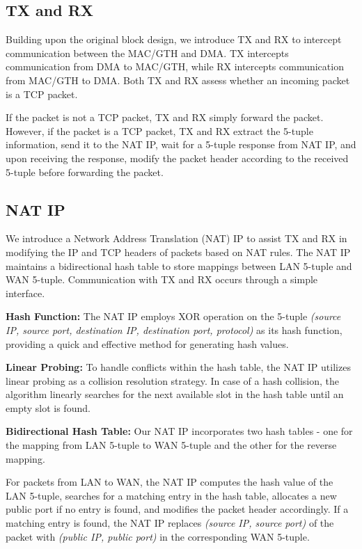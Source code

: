 \subsection{TX and RX}
Building upon the original block design, we introduce TX and RX to intercept communication between the MAC/GTH and DMA. TX intercepts communication from DMA to MAC/GTH, while RX intercepts communication from MAC/GTH to DMA. Both TX and RX assess whether an incoming packet is a TCP packet.

If the packet is not a TCP packet, TX and RX simply forward the packet. However, if the packet is a TCP packet, TX and RX extract the 5-tuple information, send it to the NAT IP, wait for a 5-tuple response from NAT IP, and upon receiving the response, modify the packet header according to the received 5-tuple before forwarding the packet.

\subsection{NAT IP}
We introduce a Network Address Translation (NAT) IP to assist TX and RX in modifying the IP and TCP headers of packets based on NAT rules. The NAT IP maintains a bidirectional hash table to store mappings between LAN 5-tuple and WAN 5-tuple. Communication with TX and RX occurs through a simple interface.

\textbf{Hash Function:} The NAT IP employs XOR operation on the 5-tuple \emph{(source IP, source port, destination IP, destination port, protocol)} as its hash function, providing a quick and effective method for generating hash values.

\textbf{Linear Probing:} To handle conflicts within the hash table, the NAT IP utilizes linear probing as a collision resolution strategy. In case of a hash collision, the algorithm linearly searches for the next available slot in the hash table until an empty slot is found.

\textbf{Bidirectional Hash Table:} Our NAT IP incorporates two hash tables - one for the mapping from LAN 5-tuple to WAN 5-tuple and the other for the reverse mapping.

For packets from LAN to WAN, the NAT IP computes the hash value of the LAN 5-tuple, searches for a matching entry in the hash table, allocates a new public port if no entry is found, and modifies the packet header accordingly. If a matching entry is found, the NAT IP replaces \emph{(source IP, source port)} of the packet with \emph{(public IP, public port)} in the corresponding WAN 5-tuple.

